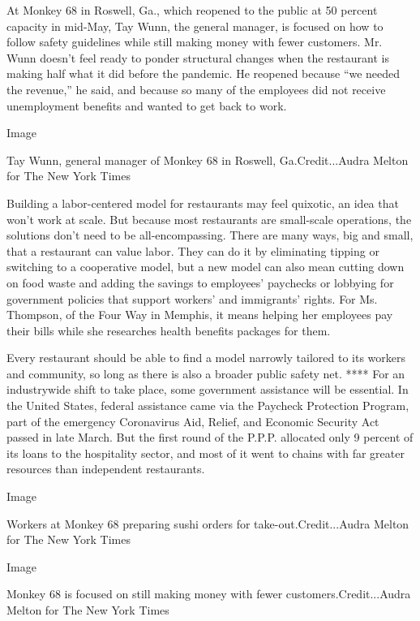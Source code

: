 At Monkey 68 in Roswell, Ga., which reopened to the public at 50 percent
capacity in mid-May, Tay Wunn, the general manager, is focused on how to
follow safety guidelines while still making money with fewer customers.
Mr. Wunn doesn't feel ready to ponder structural changes when the
restaurant is making half what it did before the pandemic. He reopened
because ``we needed the revenue,'' he said, and because so many of the
employees did not receive unemployment benefits and wanted to get back
to work.

Image

Tay Wunn, general manager of Monkey 68 in Roswell, Ga.Credit...Audra
Melton for The New York Times

Building a labor-centered model for restaurants may feel quixotic, an
idea that won't work at scale. But because most restaurants are
small-scale operations, the solutions don't need to be all-encompassing.
There are many ways, big and small, that a restaurant can value labor.
They can do it by eliminating tipping or switching to a cooperative
model, but a new model can also mean cutting down on food waste and
adding the savings to employees' paychecks or lobbying for government
policies that support workers' and immigrants' rights. For Ms. Thompson,
of the Four Way in Memphis, it means helping her employees pay their
bills while she researches health benefits packages for them.

Every restaurant should be able to find a model narrowly tailored to its
workers and community, so long as there is also a broader public safety
net. **** For an industrywide shift to take place, some government
assistance will be essential. In the United States, federal assistance
came via the Paycheck Protection Program, part of the emergency
Coronavirus Aid, Relief, and Economic Security Act passed in late March.
But the first round of the P.P.P. allocated only 9 percent of its loans
to the hospitality sector, and most of it went to chains with far
greater resources than independent restaurants.

Image

Workers at Monkey 68 preparing sushi orders for take-out.Credit...Audra
Melton for The New York Times

Image

Monkey 68 is focused on still making money with fewer
customers.Credit...Audra Melton for The New York Times

